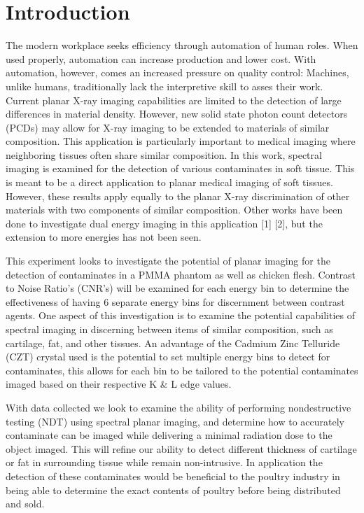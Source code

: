 \documentclass[a4paper,11pt]{article}
\begin{document}
\maketitle
%

\section{Introduction}

The modern workplace seeks efficiency through automation of human roles. When used properly, automation can increase production and lower cost. With automation, however, comes an increased pressure on quality control: Machines, unlike humans, traditionally lack the interpretive skill to asses their work. Current planar X-ray imaging capabilities are limited to the detection of large differences in material density. However, new solid state photon count detectors (PCDs) may allow for X-ray imaging to be extended to materials of similar composition. This application is particularly important to medical imaging where neighboring tissues often share similar composition. In this work, spectral imaging is examined for the detection of various contaminates in soft tissue. This is meant to be a direct application to planar medical imaging of soft tissues. However, these results apply equally to the planar X-ray discrimination of other materials with two components of similar composition. Other works have been done to investigate dual energy imaging in this application [1] [2], but the extension to more energies has not been seen.

This experiment looks to investigate the potential of planar imaging for the detection of contaminates in a PMMA phantom as well as chicken flesh. Contrast to Noise Ratio's (CNR's) will be examined for each energy bin to determine the effectiveness of having 6 separate energy bins for discernment between contrast agents. One aspect of this investigation is to examine the potential capabilities of spectral imaging in discerning between items of similar composition, such as cartilage, fat, and other tissues. An advantage of the Cadmium Zinc Telluride (CZT) crystal used is the potential to set multiple energy bins to detect for contaminates, this allows for each bin to be tailored to the potential contaminates imaged based on their respective K \& L edge values. 

With data collected we look to examine the ability of performing nondestructive testing (NDT) using spectral planar imaging, and determine how to accurately contaminate can be imaged while delivering a minimal radiation dose to the object imaged. This will refine our ability to detect different thickness of cartilage or fat in surrounding tissue while remain non-intrusive. In application the detection of these contaminates would be beneficial to the poultry industry in being able to determine the exact contents of poultry before being distributed and sold. 
\end{document}
